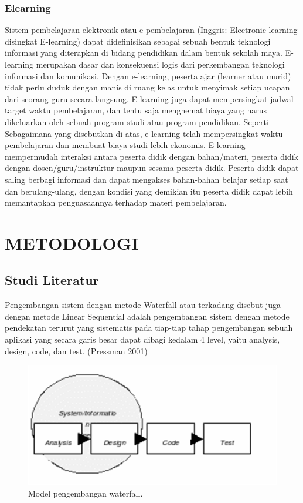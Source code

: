 \documentclass{jtetiproposalskripsi}
\begin{document}
\subsection{Elearning}
Sistem pembelajaran elektronik atau e-pembelajaran (Inggris: Electronic learning disingkat E-learning) dapat didefinisikan sebagai sebuah bentuk teknologi informasi yang diterapkan di bidang pendidikan dalam bentuk sekolah maya. E-learning merupakan dasar dan konsekuensi logis dari perkembangan teknologi informasi dan komunikasi. Dengan e-learning, peserta ajar (learner atau murid) tidak perlu duduk dengan manis di ruang kelas untuk menyimak setiap ucapan dari seorang guru secara langsung. E-learning juga dapat mempersingkat jadwal target waktu pembelajaran, dan tentu saja menghemat biaya yang harus dikeluarkan oleh sebuah program studi atau program pendidikan.
Seperti Sebagaimana yang disebutkan di atas, e-learning telah mempersingkat waktu pembelajaran dan membuat biaya studi lebih ekonomis. E-learning mempermudah interaksi antara peserta didik dengan bahan/materi, peserta didik dengan dosen/guru/instruktur maupun sesama peserta didik. Peserta didik dapat saling berbagi informasi dan dapat mengakses bahan-bahan belajar setiap saat dan berulang-ulang, dengan kondisi yang demikian itu peserta didik dapat lebih memantapkan penguasaannya terhadap materi pembelajaran.


\chapter{METODOLOGI}

\section{Studi Literatur}
Pengembangan sistem dengan metode Waterfall atau terkadang disebut juga dengan metode Linear Sequential adalah pengembangan sistem dengan metode pendekatan terurut yang sistematis pada tiap-tiap tahap pengembangan sebuah aplikasi yang secara garis besar dapat dibagi kedalam 4 level, yaitu analysis, design, code, dan test. (Pressman 2001)
\begin{figure}[ht!]
  \centering
    \includegraphics{gambar/analisis}
    \caption{Model pengembangan waterfall.}
    \label{analisis}
\end{figure}
\end{document}
